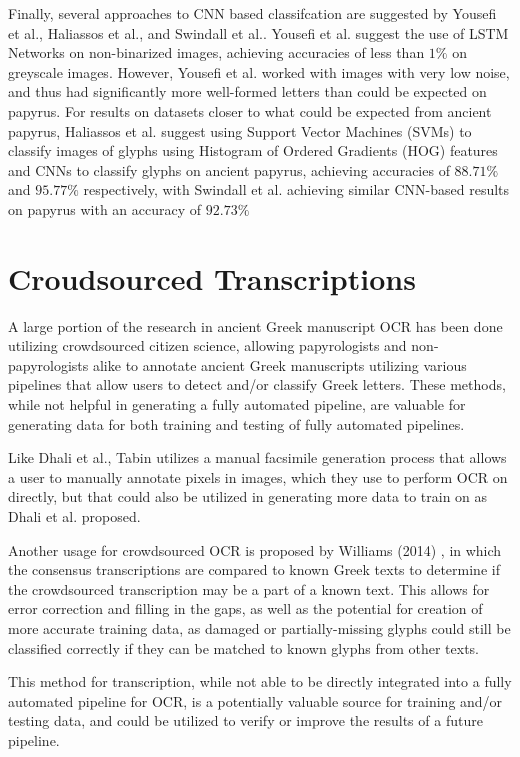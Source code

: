 Finally, several approaches to CNN based classifcation are suggested by Yousefi et al.\cite{Yousefi}, Haliassos et al.\cite{Haliassos}, and Swindall et al.\cite{Swindall}. Yousefi et al. suggest the use of LSTM Networks on non-binarized images, achieving accuracies of less than $1\%$ on greyscale images. However, Yousefi et al. worked with images with very low noise, and thus had significantly more well-formed letters than could be expected on papyrus. For results on datasets closer to what could be expected from ancient papyrus, Haliassos et al.\cite{Haliassos} suggest using Support Vector Machines (SVMs) to classify images of glyphs using Histogram of Ordered Gradients (HOG) features and CNNs to classify glyphs on ancient papyrus, achieving accuracies of $88.71\%$ and $95.77\%$ respectively, with Swindall et al.\cite{Swindall} achieving similar CNN-based results on papyrus with an accuracy of $92.73\%$

\section{Croudsourced Transcriptions}
A large portion of the research in ancient Greek manuscript OCR has been done utilizing crowdsourced citizen science, allowing papyrologists and non-papyrologists alike to annotate ancient Greek manuscripts utilizing various pipelines that allow users to detect and/or classify Greek letters.\cite{Williams2014, Williams2015, Tabin, Atanasiu} These methods, while not helpful in generating a fully automated pipeline, are valuable for generating data for both training and testing of fully automated pipelines.

Like Dhali et al.\cite{Dhali2019}, Tabin\cite{Tabin} utilizes a manual facsimile generation process that allows a user to manually annotate pixels in images, which they use to perform OCR on directly, but that could also be utilized in generating more data to train on as Dhali et al.\cite{Dhali2019} proposed.

Another usage for crowdsourced OCR is proposed by Williams (2014) \cite{Williams2014}, in which the consensus transcriptions are compared to known Greek texts to determine if the crowdsourced transcription may be a part of a known text. This allows for error correction and filling in the gaps, as well as the potential for creation of more accurate training data, as damaged or partially-missing glyphs could still be classified correctly if they can be matched to known glyphs from other texts.

This method for transcription, while not able to be directly integrated into a fully automated pipeline for OCR, is a potentially valuable source for training and/or testing data, and could be utilized to verify or improve the results of a future pipeline.
